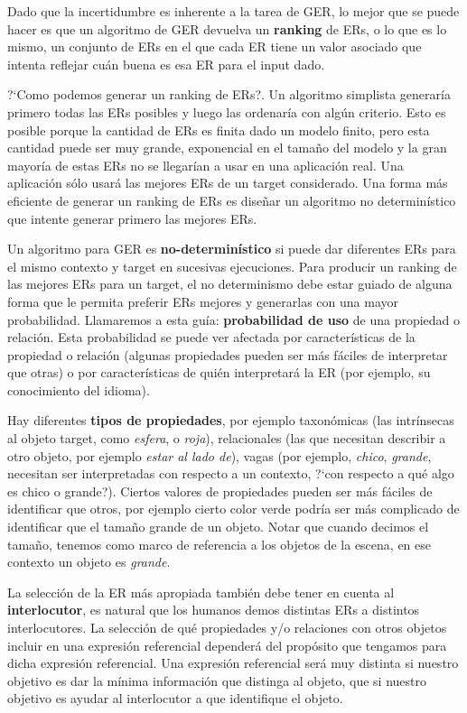 Dado que la incertidumbre es inherente a la tarea de GER, lo mejor que se puede hacer es que un algoritmo de GER devuelva un \textbf{ranking}
 de ERs, o lo que es lo mismo, un conjunto de ERs en el que cada ER tiene un valor asociado que intenta reflejar cu\'an buena es esa ER para el input dado.

?`Como podemos generar un ranking de ERs?.
Un algoritmo simplista generar\'ia primero todas las ERs posibles y luego las ordenar\'ia con alg\'un criterio. Esto es posible porque la cantidad de ERs es finita dado un modelo finito, pero esta cantidad puede ser muy grande, exponencial en el tama\~{n}o del modelo y la gran mayor\'ia de estas ERs no se llegar\'ian a usar en una aplicaci\'on real. Una aplicaci\'on s\'olo usar\'a las mejores ERs de un target considerado.
Una forma m\'as eficiente de generar un ranking de ERs es dise\~{n}ar un algoritmo no determin\'istico que intente generar primero las mejores ERs.

Un algoritmo para GER es {\bf no-determin\'istico} si puede dar diferentes ERs para el mismo contexto y target en sucesivas ejecuciones. 
Para producir un ranking de las mejores ERs para un target, el no determinismo debe estar guiado de alguna forma que le permita preferir ERs mejores y generarlas con una mayor probabilidad. Llamaremos a esta gu\'ia: \textbf{probabilidad de uso} de una propiedad o relaci\'on. Esta probabilidad se puede ver afectada por caracter\'isticas de la propiedad o relaci\'on (algunas propiedades pueden ser m\'as f\'aciles de interpretar que otras) o por caracter\'isticas de qui\'en interpretar\'a la ER (por ejemplo, su conocimiento del idioma).

Hay diferentes \textbf{tipos de propiedades}, por ejemplo taxon\'omicas (las intr\'insecas al objeto target, como \emph{esfera}, o \emph{roja}), relacionales (las que necesitan describir a otro objeto, por ejemplo {\it estar al lado de}), vagas (por ejemplo, \emph{chico}, \emph{grande}, necesitan ser interpretadas con respecto a un contexto, ?`con respecto a qu\'e algo es chico o grande?). Ciertos valores de propiedades pueden ser m\'as f\'aciles de identificar que otros, por ejemplo cierto color verde podr\'{i}a ser m\'as complicado de identificar que el tama\~no grande de un objeto. Notar que cuando decimos el tama\~no, tenemos como marco de referencia a los objetos de la escena, en ese contexto un objeto es {\it grande}.

La selecci\'on de la ER m\'as apropiada tambi\'en debe tener en cuenta al \textbf {interlocutor}, es natural que los humanos demos distintas ERs a distintos interlocutores.
La selecci\'on de qu\'e propiedades y/o relaciones con otros objetos incluir en una expresi\'on referencial depender\'a del prop\'osito que tengamos para dicha expresi\'on referencial. Una expresi\'on referencial ser\'a muy distinta si nuestro objetivo es dar la m\'inima informaci\'on que distinga al objeto, que si nuestro objetivo es ayudar al interlocutor a que identifique el objeto.

